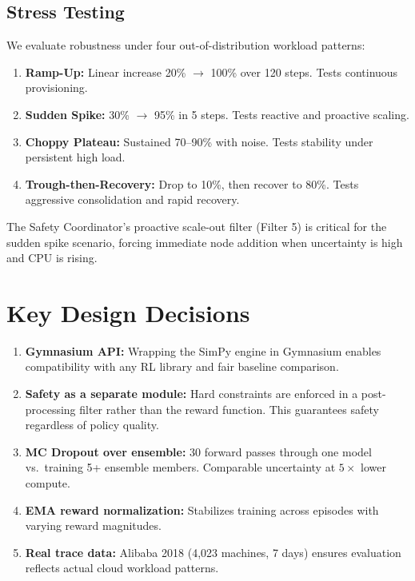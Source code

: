 \documentclass[12pt,a4paper]{article}
\begin{document}
\subsection{Stress Testing}

We evaluate robustness under four out-of-distribution workload patterns:
\begin{enumerate}
  \item \textbf{Ramp-Up:} Linear increase 20\% $\rightarrow$ 100\% over 120
        steps. Tests continuous provisioning.
  \item \textbf{Sudden Spike:} 30\% $\rightarrow$ 95\% in 5 steps. Tests
        reactive and proactive scaling.
  \item \textbf{Choppy Plateau:} Sustained 70--90\% with noise. Tests stability
        under persistent high load.
  \item \textbf{Trough-then-Recovery:} Drop to 10\%, then recover to 80\%.
        Tests aggressive consolidation and rapid recovery.
\end{enumerate}

The Safety Coordinator's proactive scale-out filter (Filter 5) is critical
for the sudden spike scenario, forcing immediate node addition when uncertainty
is high and CPU is rising.


\section{Key Design Decisions}


\begin{enumerate}
  \item \textbf{Gymnasium API:} Wrapping the SimPy engine in Gymnasium enables
        compatibility with any RL library and fair baseline comparison.

  \item \textbf{Safety as a separate module:} Hard constraints are enforced in
        a post-processing filter rather than the reward function. This
        guarantees safety regardless of policy quality.

  \item \textbf{MC Dropout over ensemble:} 30 forward passes through one model
        vs.\ training 5+ ensemble members. Comparable uncertainty at
        $5{\times}$ lower compute.

  \item \textbf{EMA reward normalization:} Stabilizes training across episodes
        with varying reward magnitudes.

  \item \textbf{Real trace data:} Alibaba 2018 (4,023 machines, 7 days) ensures
        evaluation reflects actual cloud workload patterns.
\end{enumerate}
\end{document}
